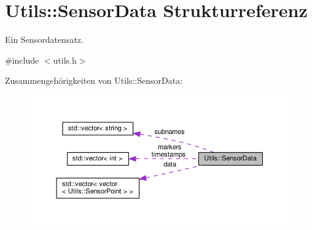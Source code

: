 \hypertarget{structUtils_1_1SensorData}{\section{Utils\-:\-:Sensor\-Data Strukturreferenz}
\label{structUtils_1_1SensorData}
}


Ein Sensordatensatz.  




{\ttfamily \#include $<$utils.\-h$>$}



Zusammengehörigkeiten von Utils\-:\-:Sensor\-Data\-:
\nopagebreak
\begin{figure}[H]
\begin{center}
\leavevmode
\includegraphics[width=350pt]{structUtils_1_1SensorData__coll__graph}
\end{center}
\end{figure}
